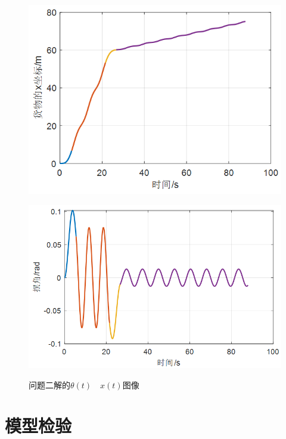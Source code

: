 \documentclass[withoutpreface,bwprint]{cumcmthesis} %
\begin{document}
\begin{figure}[!h]
    \centering
    \begin{minipage}[c]{0.48\textwidth}
        \centering
        \includegraphics[width=\textwidth]{p2x.png}
        \label{fig:sample-figure-a}
    \end{minipage}
    \begin{minipage}[c]{0.48\textwidth}
        \centering
        \includegraphics[width=\textwidth]{p2theta.png}
        \label{fig:sample-figure-b}
    \end{minipage}
    \caption{问题二解的$\theta(t)\quad x(t)$图像}
    \label{fig:sample-figure}
\end{figure}

\section{模型检验}
\end{document}
